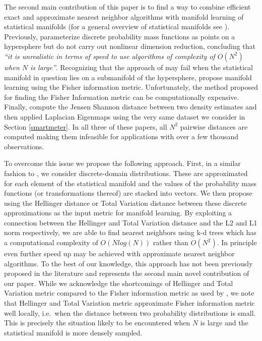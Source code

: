 \documentclass[11pt,a4paper,]{article}
\begin{document}
The second main contribution of this paper is to find a way to combine efficient exact and approximate nearest neighbor algorithms with manifold learning of statistical manifolds (for a general overview of statistical manifolds see \textcite{Amari2016-hk}). Previously, \textcite{Lee2007-qa} parameterize discrete probability mass functions as points on a hypersphere but do not carry out nonlinear dimension reduction, concluding that \emph{``it is unrealistic in terms of speed to use algorithms of complexity of \(O(N^2)\) when \(N\) is large''}. Recognizing that the approach of \textcite{Lee2007-qa} may fail when the statistical manifold in question lies on a submanifold of the hypersphere, \textcite{Carter2009-ti} propose manifold learning using the Fisher information metric. Unfortunately, the method proposed for finding the Fisher Information metric can be computationally expensive. Finally, \textcite{Hyndman2018-ia} compute the Jensen Shannon distance between two density estimates and then applied Laplacian Eigenmaps using the very same dataset we consider in Section \ref{smartmeter}. In all three of these papers, all \(N^2\) pairwise distances are computed making them infeasible for applications with over a few thousand observations.

To overcome this issue we propose the following approach. First, in a similar fashion to \textcite{Lee2007-qa}, we consider discrete-domain distributions. These are approximated for each element of the statistical manifold and the values of the probability mass functions (or transformations thereof) are stacked into vectors. We then propose using the Hellinger distance or Total Variation distance between these discrete approximations as the input metric for manifold learning. By exploiting a connection between the Hellinger and Total Variation distance and the L2 and L1 norm respectively, we are able to find nearest neighbors using k-d trees which has a computational complexity of \(O(Nlog(N))\) rather than \(O(N^2)\). In principle even further speed up may be achieved with approximate nearest neighbor algorithms. To the best of our knowledge, this approach has not been previously proposed in the literature and represents the second main novel contribution of our paper. While we acknowledge the shortcomings of Hellinger and Total Variation metric compared to the Fisher information metric as used by \textcite{Carter2009-ti}, we note that Hellinger and Total Variation metric approximate Fisher information metric well locally, i.e.~when the distance between two probability distributions is small. This is precisely the situation likely to be encountered when \(N\) is large and the statistical manifold is more densely sampled.
\end{document}
